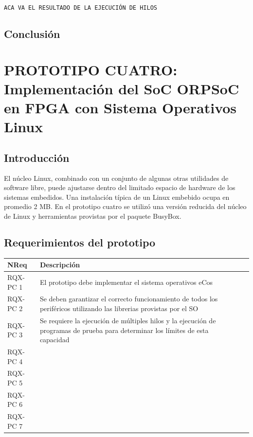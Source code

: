 \begin{lstlisting}[frame=single,caption={Salida de la ejecución del programa de prueba twothreads},label={lst:salhilos}]
 ACA VA EL RESULTADO DE LA EJECUCIÓN DE HILOS
\end{lstlisting}

		\subsection{Conclusión}


	
	\newpage			
	\section{PROTOTIPO CUATRO: Implementación del SoC ORPSoC en FPGA con Sistema Operativos Linux}
		\subsection{Introducción}
		El núcleo Linux, combinado con un conjunto de algunas otras utilidades de software libre, puede ajustarse dentro del limitado espacio de hardware 
	    de los sistemas embedidos. Una instalación típica de un Linux embebido ocupa en promedio 2 MB. En el prototipo cuatro se utilizó una versión
	    reducida del núcleo de Linux y herramientas provistas por el paquete BusyBox. 
		
		\subsection{Requerimientos del prototipo}
		
		\begin{table}[h!]
		\centering	
		\begin{tabular}{ p{2.5cm} p{8cm} p{3cm} }
		\hline 
		\rowcolor[gray]{0.8} N\textordmasculine Req & Descripción\\
		\hline 
		RQX-PC 1 & El prototipo debe implementar el sistema operativos eCos\\ 
		\hline 
		RQX-PC 2 & Se deben garantizar el correcto funcionamiento de todos los periféricos utilizando las librerias provistas por el SO\\ 
		\hline 
		RQX-PC 3 & Se requiere la ejecución de múltiples hilos y la ejecución de programas de prueba para determinar los límites de esta capacidad \\ 
		\hline
		RQX-PC 4 & \\
		\hline
		RQX-PC 5 & \\
		\hline
		RQX-PC 6 & \\
		\hline
		RQX-PC 7 & \\
		\hline		
		\end{tabular}
		\end{table}
		
